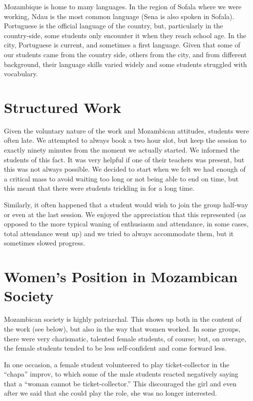 \documentclass[article,twocolumn,twoside]{memoir}
\begin{document}
Mozambique is home to many languages. In the region of Sofala where we were
working, Ndau is the most common language (Sena is also spoken in Sofala).
Portuguese is the official language of the country, but, particularly in the
country-side, some students only encounter it when they reach school age. In
the city, Portuguese is current, and sometimes a first language. Given that
some of our students came from the country side, others from the city, and from
different background, their language skills varied widely and some students
struggled with vocabulary.

\section{Structured Work}

Given the voluntary nature of the work and Mozambican attitudes, students were
often late. We attempted to always book a two hour slot, but keep the session
to exactly ninety minutes from the moment we actually started. We informed the
students of this fact. It was very helpful if one of their teachers was
present, but this was not always possible. We decided to start when we felt we
had enough of a critical mass to avoid waiting too long or not being able to
end on time, but this meant that there were students trickling in for a long
time.

Similarly, it often happened that a student would wish to join the group
half-way or even at the last session. We enjoyed the appreciation that this
represented (as opposed to the more typical waning of enthusiasm and
attendance, in some cases, total attendance went up) and we tried to always
accommodate them, but it sometimes slowed progress.

\section{Women's Position in Mozambican Society}

Mozambican society is highly patriarchal. This shows up both in the content
of the work (see below), but also in the way that women worked. In some groups,
there were very charismatic, talented female students, of course; but, on
average, the female students tended to be less self-confident and come forward
less.

In one occasion, a female student volunteered to play ticket-collector in the
``chapa'' improv, to which some of the male students reacted negatively saying
that a ``woman cannot be ticket-collector.'' This discouraged the girl and even
after we said that she could play the role, she was no longer interested.
\end{document}
